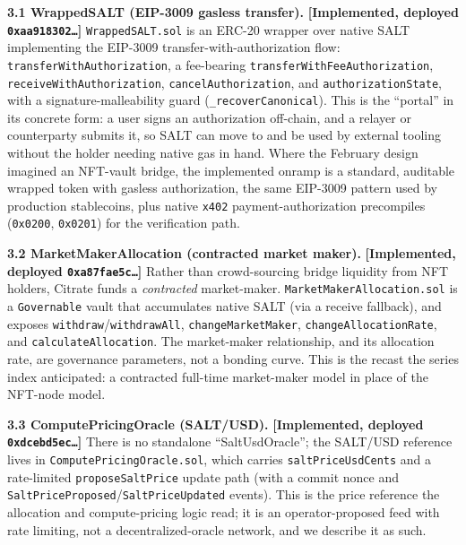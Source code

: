 \textbf{3.1 WrappedSALT (EIP-3009 gasless transfer).}
\textbf{{[}Implemented, deployed \texttt{0xaa918302…}{]}}
\texttt{WrappedSALT.sol} is an ERC-20 wrapper over native SALT
implementing the EIP-3009 transfer-with-authorization flow:
\texttt{transferWithAuthorization}, a fee-bearing
\texttt{transferWithFeeAuthorization},
\texttt{receiveWithAuthorization}, \texttt{cancelAuthorization}, and
\texttt{authorizationState}, with a signature-malleability guard
(\texttt{\_recoverCanonical}). This is the ``portal'' in its concrete
form: a user signs an authorization off-chain, and a relayer or
counterparty submits it, so SALT can move to and be used by external
tooling without the holder needing native gas in hand. Where the
February design imagined an NFT-vault bridge, the implemented onramp is
a standard, auditable wrapped token with gasless authorization, the same
EIP-3009 pattern used by production stablecoins, plus native
\texttt{x402} payment-authorization precompiles (\texttt{0x0200},
\texttt{0x0201}) for the verification path.

\textbf{3.2 MarketMakerAllocation (contracted market maker).}
\textbf{{[}Implemented, deployed \texttt{0xa87fae5c…}{]}} Rather than
crowd-sourcing bridge liquidity from NFT holders, Citrate funds a
\emph{contracted} market-maker. \texttt{MarketMakerAllocation.sol} is a
\texttt{Governable} vault that accumulates native SALT (via a receive
fallback), and exposes \texttt{withdraw}/\texttt{withdrawAll},
\texttt{changeMarketMaker}, \texttt{changeAllocationRate}, and
\texttt{calculateAllocation}. The market-maker relationship, and its
allocation rate, are governance parameters, not a bonding curve. This is
the recast the series index anticipated: a contracted full-time
market-maker model in place of the NFT-node model.

\textbf{3.3 ComputePricingOracle (SALT/USD).} \textbf{{[}Implemented,
deployed \texttt{0xdcebd5ec…}{]}} There is no standalone
``SaltUsdOracle''; the SALT/USD reference lives in
\texttt{ComputePricingOracle.sol}, which carries
\texttt{saltPriceUsdCents} and a rate-limited \texttt{proposeSaltPrice}
update path (with a commit nonce and
\texttt{SaltPriceProposed}/\texttt{SaltPriceUpdated} events). This is
the price reference the allocation and compute-pricing logic read; it is
an operator-proposed feed with rate limiting, not a decentralized-oracle
network, and we describe it as such.


